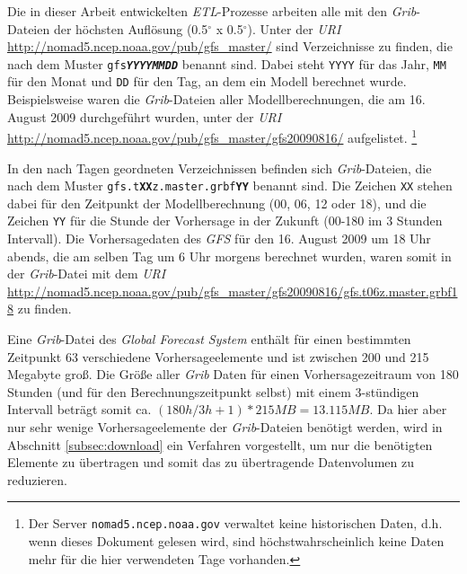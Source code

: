 Die in dieser Arbeit entwickelten \textit{ETL}-Prozesse arbeiten alle
mit den \textit{Grib}-Dateien der höchsten Auflösung (0.5$^{\circ}$ x
0.5$^{\circ}$). Unter der \textit{URI}
\url{http://nomad5.ncep.noaa.gov/pub/gfs_master/} sind Verzeichnisse
zu finden, die nach dem Muster \texttt{gfs\textbf{\textit{YYYYMMDD}}} benannt
sind. Dabei steht \texttt{YYYY} für das Jahr, \texttt{MM} für den
Monat und \texttt{DD} für den Tag, an dem ein Modell berechnet
wurde. Beispielsweise waren die \textit{Grib}-Dateien aller
Modellberechnungen, die am 16. August 2009 durchgeführt wurden, unter
der \textit{URI}
\url{http://nomad5.ncep.noaa.gov/pub/gfs_master/gfs20090816/}
aufgelistet.  \footnote{Der Server \texttt{nomad5.ncep.noaa.gov}
  verwaltet keine historischen Daten, d.h. wenn dieses Dokument
  gelesen wird, sind höchstwahrscheinlich keine Daten mehr für die
  hier verwendeten Tage vorhanden.}

In den nach Tagen geordneten Verzeichnissen befinden sich
\textit{Grib}-Dateien, die nach dem Muster
\texttt{gfs.t\textbf{XX}z.master.grbf\textbf{YY}} benannt sind. Die
Zeichen \texttt{XX} stehen dabei für den Zeitpunkt der
Modellberechnung (00, 06, 12 oder 18), und die Zeichen \texttt{YY} für
die Stunde der Vorhersage in der Zukunft (00-180 im 3 Stunden
Intervall). Die Vorhersagedaten des \textit{GFS} für den 16. August
2009 um 18 Uhr abends, die am selben Tag um 6 Uhr morgens berechnet
wurden, waren somit in der \textit{Grib}-Datei mit dem \textit{URI}
\url{http://nomad5.ncep.noaa.gov/pub/gfs_master/gfs20090816/gfs.t06z.master.grbf18}
zu finden.

Eine \textit{Grib}-Datei des \textit{Global Forecast System} enthält
für einen bestimmten Zeitpunkt 63 verschiedene Vorhersageelemente und
ist zwischen 200 und 215 Megabyte groß. Die Größe aller \textit{Grib}
Daten für einen Vorhersagezeitraum von 180 Stunden (und für den
Berechnungszeitpunkt selbst) mit einem 3-stündigen Intervall beträgt
somit ca. $(180h / 3h + 1) * 215 MB = 13.115 MB$. Da hier aber nur
sehr wenige Vorhersageelemente der \textit{Grib}-Dateien benötigt
werden, wird in Abschnitt \ref{subsec:download} ein Verfahren
vorgestellt, um nur die benötigten Elemente zu übertragen und somit
das zu übertragende Datenvolumen zu reduzieren.

